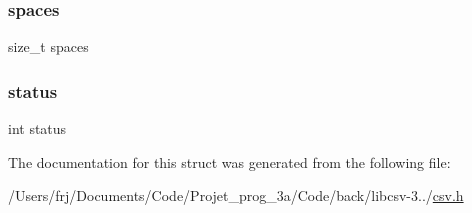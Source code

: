 \hypertarget{structcsv__parser_a8285d03865a23548f549a0dafe1639f7}{}\label{structcsv__parser_a8285d03865a23548f549a0dafe1639f7} 
\subsubsection{\texorpdfstring{spaces}{spaces}}
{\footnotesize\ttfamily size\+\_\+t spaces}

\hypertarget{structcsv__parser_a6e27f49150e9a14580fb313cc2777e00}{}\label{structcsv__parser_a6e27f49150e9a14580fb313cc2777e00} 
\subsubsection{\texorpdfstring{status}{status}}
{\footnotesize\ttfamily int status}



The documentation for this struct was generated from the following file\+:\begin{DoxyCompactItemize}
\item 
/\+Users/frj/\+Documents/\+Code/\+Projet\+\_\+prog\+\_\+3a/\+Code/back/libcsv-\/3../\hyperlink{csv_8h}{csv.\+h}\end{DoxyCompactItemize}
